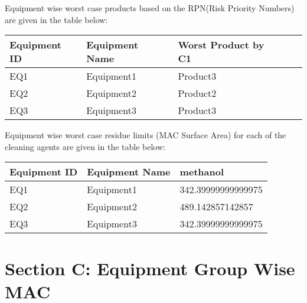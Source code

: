 \documentclass{article}
\begin{document}
        
        Equipment wise worst case products based on the RPN(Risk Priority Numbers) are given in the table below:
        \begin{longtable}[l]{|p{3cm} |p{3cm} |p{3.5cm} |p{3.5cm} |p{3.5cm} |} \hline
        
            Equipment ID&Equipment Name&Worst Product by C1\\\hline
        
            EQ1&Equipment1&Product3\\\hline
        
            EQ2&Equipment2&Product2\\\hline
        
            EQ3&Equipment3&Product3\\\hline
        
        \end{longtable}
        
        
        Equipment wise worst case residue limits (MAC Surface Area) for each of the cleaning agents are given in the table below:
        \begin{longtable}[l]{|p{2cm} |p{2cm} |p{4cm} |} \hline
        
        Equipment ID&Equipment Name&methanol\\\hline
        
        EQ1&Equipment1&342.39999999999975\\\hline
        
        EQ2&Equipment2&489.142857142857\\\hline
        
        EQ3&Equipment3&342.39999999999975\\\hline
        
        \end{longtable}
        
        \newpage
        \section{Section C: Equipment Group Wise MAC}
        
\end{document}
